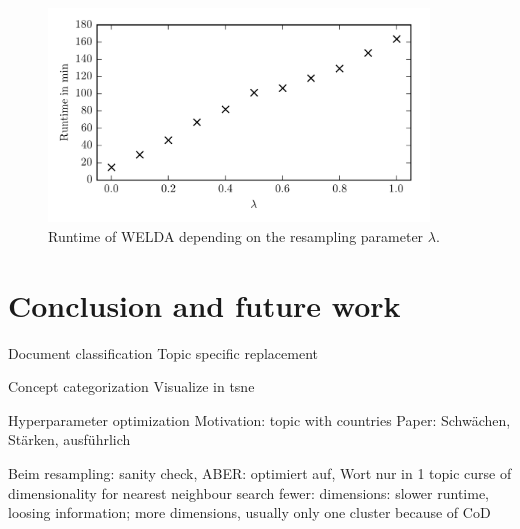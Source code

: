 \documentclass[
        a4paper,
        titlepage,
        twoside,
        parskip
        ]{scrbook}
\theoremstyle{break}
\begin{document}
\begin{figure}
       \centering
       \includegraphics[width=0.9\textwidth]{figures/welda_lambda_runtime.png}
       \caption{Runtime of WELDA depending on the resampling parameter $\lambda$.}
       \label{fig:welda_lambda_runtime}
\end{figure}



\chapter{Conclusion and future work}
\label{sec:conclusion}

Document classification
Topic specific replacement

Concept categorization
Visualize in tsne

Hyperparameter optimization
Motivation: topic with countries
Paper: Schwächen, Stärken, ausführlich

Beim resampling: sanity check, ABER: optimiert auf, Wort nur in 1 topic
curse of dimensionality for nearest neighbour search
fewer: dimensions: slower runtime, loosing information; more dimensions, usually only one cluster because of CoD

\clearpage
\end{document}
